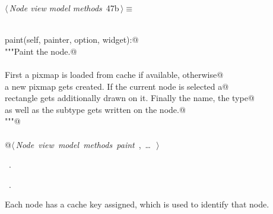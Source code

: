 \documentclass[
    a4paper,      %
    10pt,         %
    openright,    %
    notitlepage,  %
    parskip=half, %
]{scrreprt}       %
\theoremstyle{definition}                    %
\begin{document}
\begin{flushleft} \small
\begin{minipage}{\linewidth}\label{scrap64}\raggedright\small
{} $\langle\,${\itshape Node view model methods}\nobreak\ {\footnotesize {47b}}$\,\rangle\equiv$
\vspace{-1ex}
\begin{list}{}{} \item
\mbox{}\lstinline@@\\
\mbox{}\lstinline@def paint(self, painter, option, widget):@\\
\mbox{}\lstinline@    """Paint the node.@\\
\mbox{}\lstinline@@\\
\mbox{}\lstinline@    First a pixmap is loaded from cache if available, otherwise@\\
\mbox{}\lstinline@    a new pixmap gets created. If the current node is selected a@\\
\mbox{}\lstinline@    rectangle gets additionally drawn on it. Finally the name, the type@\\
\mbox{}\lstinline@    as well as the subtype gets written on the node.@\\
\mbox{}\lstinline@    """@\\
\mbox{}\lstinline@@\\
\mbox{}\lstinline@    @\hbox{$\langle\,${\itshape Node view model methods paint}\nobreak\ {\footnotesize {}, \ldots\ }$\,\rangle$}\lstinline@@\\
\mbox{}\lstinline@@{\NWsep}
\end{list}
\vspace{-1.5ex}
\footnotesize
\begin{list}{}{\setlength{\itemsep}{-\parsep}\setlength{\itemindent}{-\leftmargin}}
\item \NWtxtMacroDefBy\ .
\item \NWtxtMacroRefIn\ .

\item{}
\end{list}
\end{minipage}\vspace{4ex}
\end{flushleft}
Each node has a cache key assigned, which is used to identify that node.
\end{document}
